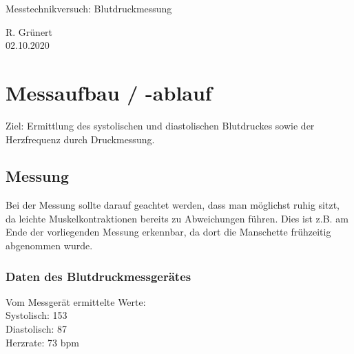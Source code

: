 \documentclass{article}
\begin{document}
\begin{center}
\Large{Messtechnikversuch: Blutdruckmessung}
\end{center}

\begin{flushright}
  R. Grünert\\
  02.10.2020
\end{flushright}

\section{Messaufbau / -ablauf}
\begin{center}
\end{center}

Ziel: Ermittlung des systolischen und diastolischen Blutdruckes sowie der Herzfrequenz durch Druckmessung.\\

\subsection{Messung}
Bei der Messung sollte darauf geachtet werden, dass man möglichst ruhig sitzt, da leichte Muskelkontraktionen bereits zu Abweichungen führen. Dies ist z.B. am Ende der vorliegenden Messung erkennbar, da dort die Manschette frühzeitig abgenommen wurde.

\subsubsection{Daten des Blutdruckmessgerätes}
Vom Messgerät ermittelte Werte:\\
Systolisch: 153\\
Diastolisch: 87\\
Herzrate: 73 bpm
\end{document}
